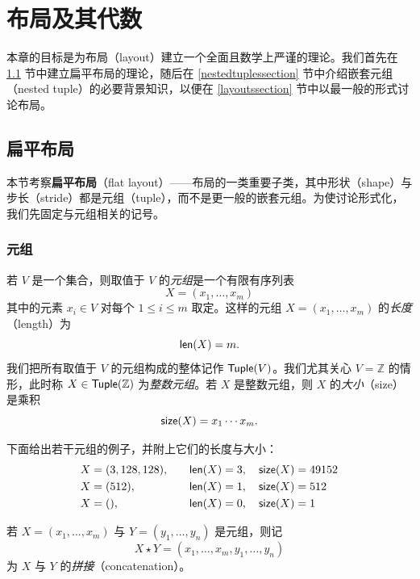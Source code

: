 \chapter{布局及其代数}\label{layoutschapter}

本章的目标是为布局（layout）建立一个全面且数学上严谨的理论。我们首先在 \ref{flatlayoutssection} 节中建立扁平布局的理论，随后在 \ref{nestedtuplessection} 节中介绍嵌套元组（nested tuple）的必要背景知识，以便在 \ref{layoutssection} 节中以最一般的形式讨论布局。


\section{扁平布局}\label{flatlayoutssection}

本节考察{\bf 扁平布局}（flat layout）——布局的一类重要子类，其中形状（shape）与步长（stride）都是元组（tuple），而不是更一般的嵌套元组。为使讨论形式化，我们先固定与元组相关的记号。

\subsection{元组}\label{tuplessection}

\begin{definition}
    若 $V$ 是一个集合，则取值于 $V$ 的{\it 元组}是一个有限有序列表
    \[
    X = (x_1,\dots,x_m)
    \]
    其中的元素 $x_i \in V$ 对每个 $1 \le i \le m$ 取定。这样的元组 $X=(x_1,\dots,x_m)$ 的{\it 长度}（length）为
    \[\mathsf{len}(X) = m.\]
    我们把所有取值于 $V$ 的元组构成的整体记作 $\mathsf{Tuple}(V)$。我们尤其关心 $V = \mathbb{Z}$ 的情形，此时称 $X \in \mathsf{Tuple}(\mathbb{Z})$ 为{\it 整数元组}。若 $X$ 是整数元组，则 $X$ 的{\it 大小}（size）是乘积
    \[
        \mathsf{size}(X) = x_1 \cdots x_m.
        \]
\end{definition}

\begin{example}
下面给出若干元组的例子，并附上它们的长度与大小：
\[
\begin{aligned}
X &= (3, 128, 128), & \quad \mathsf{len}(X) &= 3, \quad \mathsf{size}(X) = 49152 \\
X &= (512),         & \quad \mathsf{len}(X) &= 1, \quad \mathsf{size}(X) = 512 \\
X &= (),            & \quad \mathsf{len}(X) &= 0, \quad \mathsf{size}(X) = 1
\end{aligned}
\]
\end{example}

\begin{definition}\label{definitionofconcatenationoftuples}
若 $ X = (x_1,\dots,x_m)$ 与 $Y = (y_1,\dots,y_n)$ 是元组，则记
\[
X \star Y = (x_1,\dots,x_m,y_1,\dots,y_n)
\]
为 $X$ 与 $Y$ 的{\it 拼接}（concatenation）。
\end{definition}


